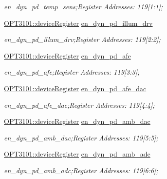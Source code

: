 \begin{DoxyCompactItemize}
\begin{DoxyCompactList}\small\item\em en\+\_\+dyn\+\_\+pd\+\_\+temp\+\_\+sens;Register Addresses\+: 119\mbox{[}1\+:1\mbox{]}; \end{DoxyCompactList}\item 
\mbox{\hyperlink{class_o_p_t3101_1_1device_register}{O\+P\+T3101\+::device\+Register}} \mbox{\hyperlink{class_o_p_t3101_1_1registers_a3d35466027ea9481c01cfd02807cb0b1}{en\+\_\+dyn\+\_\+pd\+\_\+illum\+\_\+drv}}
\begin{DoxyCompactList}\small\item\em en\+\_\+dyn\+\_\+pd\+\_\+illum\+\_\+drv;Register Addresses\+: 119\mbox{[}2\+:2\mbox{]}; \end{DoxyCompactList}\item 
\mbox{\hyperlink{class_o_p_t3101_1_1device_register}{O\+P\+T3101\+::device\+Register}} \mbox{\hyperlink{class_o_p_t3101_1_1registers_a78ff3c5f329d4fc1c2a716b84489e16b}{en\+\_\+dyn\+\_\+pd\+\_\+afe}}
\begin{DoxyCompactList}\small\item\em en\+\_\+dyn\+\_\+pd\+\_\+afe;Register Addresses\+: 119\mbox{[}3\+:3\mbox{]}; \end{DoxyCompactList}\item 
\mbox{\hyperlink{class_o_p_t3101_1_1device_register}{O\+P\+T3101\+::device\+Register}} \mbox{\hyperlink{class_o_p_t3101_1_1registers_ab40ca42c0183dabd4627e21d37b032b8}{en\+\_\+dyn\+\_\+pd\+\_\+afe\+\_\+dac}}
\begin{DoxyCompactList}\small\item\em en\+\_\+dyn\+\_\+pd\+\_\+afe\+\_\+dac;Register Addresses\+: 119\mbox{[}4\+:4\mbox{]}; \end{DoxyCompactList}\item 
\mbox{\hyperlink{class_o_p_t3101_1_1device_register}{O\+P\+T3101\+::device\+Register}} \mbox{\hyperlink{class_o_p_t3101_1_1registers_ab88e46689a8ad54e1cd9f2a74916efd4}{en\+\_\+dyn\+\_\+pd\+\_\+amb\+\_\+dac}}
\begin{DoxyCompactList}\small\item\em en\+\_\+dyn\+\_\+pd\+\_\+amb\+\_\+dac;Register Addresses\+: 119\mbox{[}5\+:5\mbox{]}; \end{DoxyCompactList}\item 
\mbox{\hyperlink{class_o_p_t3101_1_1device_register}{O\+P\+T3101\+::device\+Register}} \mbox{\hyperlink{class_o_p_t3101_1_1registers_aa1e39ebb068de61f66df1b25a6d2551b}{en\+\_\+dyn\+\_\+pd\+\_\+amb\+\_\+adc}}
\begin{DoxyCompactList}\small\item\em en\+\_\+dyn\+\_\+pd\+\_\+amb\+\_\+adc;Register Addresses\+: 119\mbox{[}6\+:6\mbox{]}; \end{DoxyCompactList}\item 

\end{DoxyCompactItemize}
